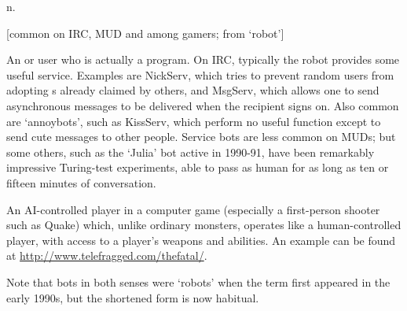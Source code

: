  n.

[common on IRC, MUD and among gamers; from `robot']
\begin{inparaenum}
\item An  or  user who is actually a program. On
    IRC, typically the robot provides some useful service. Examples are
    NickServ, which tries to prevent random users from adopting
    s already claimed by others, and MsgServ, which allows one
    to send asynchronous messages to be delivered when the recipient signs on.
    Also common are `annoybots', such as KissServ, which perform no useful
    function except to send cute messages to other people. Service bots are less
    common on MUDs; but some others, such as the `Julia' bot active in 1990-91,
    have been remarkably impressive Turing-test experiments, able to pass as
    human for as long as ten or fifteen minutes of conversation.
\item An AI-controlled player in a computer game (especially a first-person
    shooter such as Quake) which, unlike ordinary monsters, operates like a
    human-controlled player, with access to a player's weapons and abilities. An
    example can be found at \url{http://www.telefragged.com/thefatal/}.
\end{inparaenum}

Note that bots in both senses were `robots' when the term first appeared in the
early 1990s, but the shortened form is now habitual.

